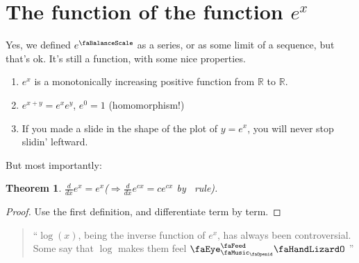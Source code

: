 \documentclass[12pt,a4paper]{amsart}
\newtheorem*{Theorem}                    {Theorem}
\theoremstyle{definition}
\theoremstyle{remark}
\newcommand{\mute}[1] {}
\def \R{\mathbb{R}}
\begin{document}
\section{The function of the function $e^x$}
Yes, we defined $e^{\text{\faBalanceScale}}$ as a series, or 
as some limit of a sequence, but that's ok. It's still a function, 
with some nice properties.
\begin{enumerate}
  \item $e^x$ is a monotonically increasing positive function 
    from $\R$ to $\R$.
  \item $e^{x+y} = e^x e^y$, $e^0=1$ (homomorphism!)
  \item If you made a slide in the shape of the plot of $y=e^x$, 
    you will never stop slidin' leftward.
\end{enumerate}
\begin{center}
\end{center}
But most importantly:
\begin{Theorem}
  $\frac{d}{dx} e^x = e^x$($\Rightarrow \frac{d}{dx}e^{cx}=ce^{cx}$ by 
  \faChain \ rule).
\end{Theorem}
\begin{proof}
  Use the first definition, and differentiate term by term.
\end{proof}
\newpage
\begin{quote}
  \enquote{$\log(x)$, being the inverse function of $e^x$, has always been 
  controversial. Some say that $\log$ makes them feel $\text{\faEye}^
  \text{\faFeed}_{\text{\faMusic}_{\text{\faOpenid}}}\text{\faHandLizardO}$
  \mute{Cat and mouse, oil and water, Israel 
  and Palestine. None compare to the battle between $e$ and $\log$.}}
\end{quote}
\end{document}
